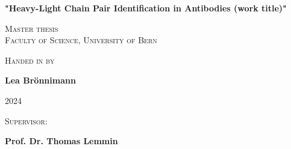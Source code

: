 \begin{titlepage}
  \centering
  {\huge\bfseries "Heavy-Light Chain Pair Identification in Antibodies (work title)" \par}
  \vspace{2cm}
   {\scshape\LARGE Master thesis \\ Faculty of Science,  University of Bern  \par}
  \vspace{1cm}
  {\scshape\Large Handed in by \par}
  \vspace{0cm}
  {\Large \textbf{Lea Br\"{o}nnimann} \par}
  \vfill
  {\Large \scshape 2024 \par}
  \vspace{2cm}
  {\scshape\Large Supervisor: \par}
  \vspace{0cm}
  {\Large \textbf{Prof. Dr. Thomas Lemmin} \par}
  \textbf{} \par
  \vfill
  \vfill
  \textbf{} \par
   \par
 \par
  \vfill

\end{titlepage}
